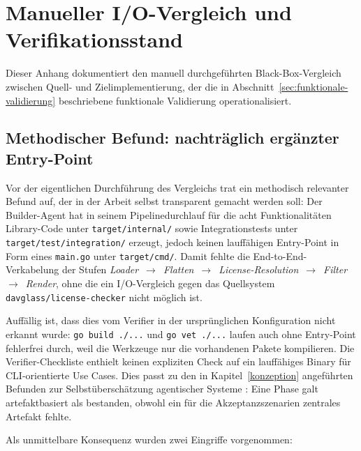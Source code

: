 \clearpage
\renewcommand{\thesection}{\Alph{section}}
\setcounter{section}{0}

\section{Manueller I/O-Vergleich und Verifikationsstand} \label{anhang:io-compare}

Dieser Anhang dokumentiert den manuell durchgeführten Black-Box-Vergleich zwischen Quell- und Zielimplementierung, der die in Abschnitt~\ref{sec:funktionale-validierung} beschriebene funktionale Validierung operationalisiert.

\subsection{Methodischer Befund: nachträglich ergänzter Entry-Point}\label{anhang:builder-gap}

Vor der eigentlichen Durchführung des Vergleichs trat ein methodisch relevanter Befund auf, der in der Arbeit selbst transparent gemacht werden soll: Der Builder-Agent hat in seinem Pipelinedurchlauf für die acht Funktionalitäten Library-Code unter \texttt{target/internal/} sowie Integrationstests unter \texttt{target/test/integration/} erzeugt, jedoch keinen lauffähigen Entry-Point in Form eines \texttt{main.go} unter \texttt{target/cmd/}. Damit fehlte die End-to-End-Verkabelung der Stufen \emph{Loader}~$\rightarrow$~\emph{Flatten}~$\rightarrow$~\emph{License-Resolution}~$\rightarrow$~\emph{Filter}~$\rightarrow$~\emph{Render}, ohne die ein I/O-Vergleich gegen das Quellsystem \texttt{davglass/license-checker} nicht möglich ist.

Auffällig ist, dass dies vom Verifier in der ursprünglichen Konfiguration nicht erkannt wurde: \texttt{go build ./...} und \texttt{go vet ./...} laufen auch ohne Entry-Point fehlerfrei durch, weil die Werkzeuge nur die vorhandenen Pakete kompilieren. Die Verifier-Checkliste enthielt keinen expliziten Check auf ein lauffähiges Binary für CLI-orientierte Use Cases. Dies passt zu den in Kapitel~\ref{konzeption} angeführten Befunden zur Selbstüberschätzung agentischer Systeme \parencite{huang2024cannotselfcorrect,korn2026reportingprompting}: Eine Phase galt artefaktbasiert als bestanden, obwohl ein für die Akzeptanzszenarien zentrales Artefakt fehlte.

Als unmittelbare Konsequenz wurden zwei Eingriffe vorgenommen:

